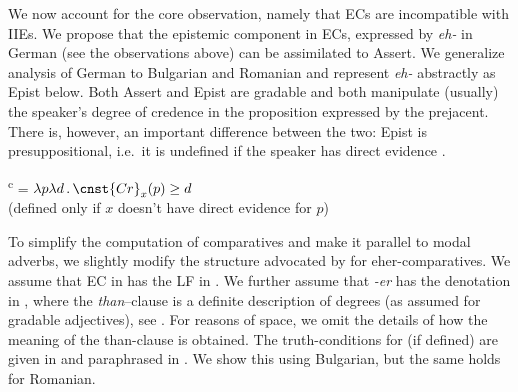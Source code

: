 \documentclass[output=paper,
]{langscibook}
\begin{document}
	 \label{pofi} 
    \z 

\noindent We now account for the core observation, namely that ECs are incompatible with IIEs. We propose that the  epistemic component in ECs, expressed by \textit{eh-} in German (see the observations above) can be assimilated to  Assert. We generalize  analysis of German to Bulgarian and Romanian and represent \textit{eh-} abstractly as
Epist below. Both Assert and Epist are gradable and both manipulate (usually) the speaker's degree of credence in the proposition expressed by the prejacent. There is, however, an important difference between the two: Epist is presuppositional, i.e.\ it is undefined if the speaker has direct evidence \citep[see the discussion in][]{herrub14}. 
 
	 \ea {}\textsuperscript{c} = $\lambda p\lambda d\,.\,\cnst{Cr}_{x}(p) \geq d$\\  (defined only if $x$ doesn't have direct evidence for $p$) \label{}
 	\z 

\noindent To simplify the computation of comparatives and make it parallel to modal adverbs, we slightly modify the structure advocated by \citet{herrub14} for eher-comparatives. We assume that EC in  has the LF in . We further assume that \textit{-er} has the denotation in , where the \textit{than}--clause is a definite description of degrees (as assumed for gradable adjectives), see . For reasons of space, we omit the details of how the meaning of the than-clause is obtained.
The truth-conditions for  (if defined) are given in  and paraphrased in . We show this using Bulgarian, but the same holds for Romanian. 
	
\end{document}

